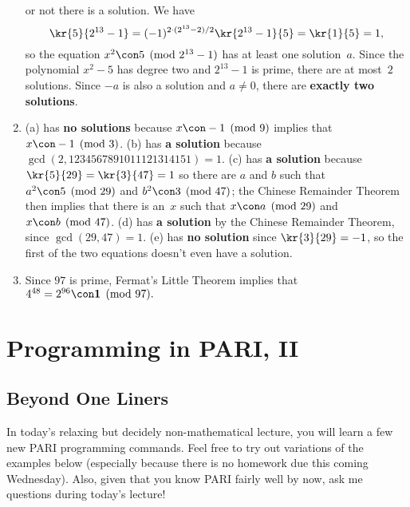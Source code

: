 \documentclass[11pt]{report}
\begin{document}
\begin{enumerate}
        or not there is a solution.  We have
        $$
          \kr{5}{2^{13}-1} = (-1)^{2\cdot (2^{13}-2)/2}\kr{2^{13}-1}{5}
          = \kr{1}{5} = 1,
        $$
        so the equation $x^2\con 5\pmod{2^{13}-1}$ has at least one solution~$a$.
        Since the polynomial $x^2- 5$ has degree two and $2^{13}-1$ is prime,
        there are at most~$2$ solutions. Since $-a$ is also a solution and $a\neq 0$,
        there are {\bf exactly two solutions}.
  \item (a) has {\bf no solutions} because $x\con -1\pmod{9}$ implies that
        $x\con -1\pmod{3}$.  (b) has {\bf a solution} because
        $\gcd(2,1234567891011121314151)=1$.
        (c) has {\bf a solution} because $\kr{5}{29}=\kr{3}{47}=1$ so there are
        $a$ and $b$ such that $a^2\con 5\pmod{29}$ and $b^2\con 3\pmod{47}$;
        the Chinese Remainder Theorem then implies that there is an~$x$ such
        that $x\con a\pmod{29}$ and $x\con b\pmod{47}$.  (d) has {\bf a solution}
        by the Chinese Remainder Theorem, since $\gcd(29,47)=1$.
        (e) has {\bf no solution}
        since $\kr{3}{29}=-1$, so the first of the two equations
        doesn't even have a solution.
  \item Since $97$ is prime, Fermat's Little Theorem implies that
        $4^{48} = 2^{96} \con \mathbf{1}\pmod{97}.$

\end{enumerate}







\chapter{Programming in PARI, II}
\newcommand{\bs}{\mbox{$\backslash$}}



\section{Beyond One Liners}
In today's relaxing but decidely non-mathematical lecture, you will
learn a few new PARI programming commands.  Feel free to try out
variations of the examples below (especially because there is no
homework due this coming Wednesday).  Also, given that you know PARI
fairly well by now, ask me questions during today's lecture!
\end{document}
